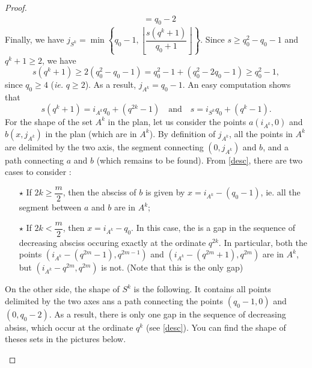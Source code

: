 \documentclass[a4paper]{article}
\begin{document}
\begin{proof}
\begin{align*}
            &= q_0-2
\end{align*}
Finally, we have $j_{S^k} = \min \left\{ q_0-1, \left\lfloor \dfrac{s(q^k+1)}{q_0+1} \right\rfloor \right\}$. Since $s \geq q_0^2 - q_0 -1$ and $q^k+1 \geq 2$, we have
\begin{equation} \label{desc}
s(q^k+1) \geq 2(q_0^2-q_0-1) = q_0^2 - 1 + (q_0^2-2q_0-1) \geq q_0^2-1,
\end{equation}
since $q_0 \geq 4$ (\emph{ie.} $q \geq 2$). As a result, $j_{A^k} = q_0-1$. 
An easy computation shows that 
\[s(q^k+1) = i_{A^k}q_0+(q^{2k}-1) \quad \mathrm{and} \quad s=i_{S^k}q_0 + (q^k-1).\]
For the shape of the set $A^k$ in the plan, let us consider the points $a(i_{A^k},0)$ and $b(x,j_{A^k})$ in the plan (which are in $A^k$). By definition of $j_{A^k}$, all the points in $A^k$ are delimited by the two axis, the segment connecting $(0,j_{A^k})$ and $b$, and a path connecting $a$ and $b$ (which remains to be found). From \eqref{desc}, there are two cases to consider :  
\begin{enumerate}
    \item[$\star$] If $2k \geq \dfrac{m}{2}$, then the absciss of $b$ is given by $x=i_{A^k}-(q_0-1)$, ie. all the segment between $a$ and $b$ are in $A^k$;
    \item[$\star$] If $2k < \dfrac{m}{2}$, then $x=i_{A^k}-q_0$. In this case, the is a gap in the sequence of decreasing absciss occuring exactly at the ordinate $q^{2k}$. In particular, both the points $(i_{A^k}-(q^{2m}-1),q^{2m-1})$ and $(i_{A^k}-(q^{2m}+1),q^{2m})$ are in $A^k$, but $(i_{A^k}-q^{2m},q^{2m})$ is not. (Note that this is the only gap)
\end{enumerate}
On the other side, the shape of $S^k$ is the following. It contains all points delimited by the two axes ans a path connecting the points $(q_0-1,0)$ and $(0,q_0-2)$. As a result, there is only one gap in the sequence of decreasing absiss, which occur at the ordinate $q^k$ (see \eqref{desc}). You can find the shape of theses sets in the pictures below.

\vspace*{0.3cm}
\begin{figure}[h]
\begin{center}
\end{center}
\end{figure}
\end{proof}
\end{document}
